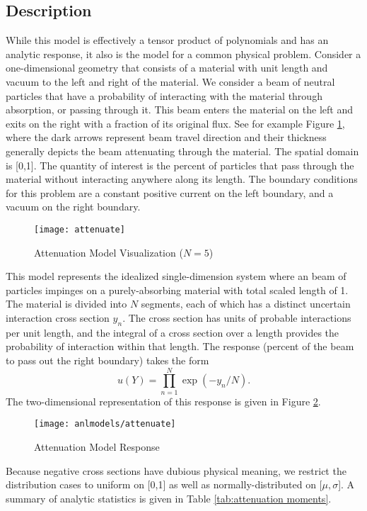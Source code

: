 \subsection{Description}\label{mod:attenuation}
While this model is effectively a tensor product of polynomials and has an analytic response, 
it also is the model for a common physical problem.
Consider a one-dimensional geometry that consists of a material with unit length and vacuum to the left and
right of the material.  We consider a beam of neutral particles that have a probability of interacting
with the material through absorption, or passing through it.  This beam enters the material on the left
and exits on the right with a fraction of its original flux.  See for example Figure \ref{fig: atten}, where
the dark arrows represent beam travel direction and their thickness generally depicts the beam attenuating
through the material.  The spatial domain is [0,1].
The quantity of interest is the percent of particles that pass through the material without interacting
anywhere along its length.  The boundary conditions for this problem are a constant positive current on the 
left boundary, and a vacuum on the right boundary.
\begin{figure}[htb]
  \centering
  \texttt{[image: attenuate]}
  \caption{Attenuation Model Visualization ($N=5$)}
  \label{fig: atten}
\end{figure}

This model represents the idealized single-dimension system where an beam of particles impinges on a
purely-absorbing material with total scaled length of 1.
The material is divided into $N$ segments, each of which
has a distinct uncertain interaction cross section $y_n$.  The cross section has units of probable interactions
per unit length, and the integral of a cross section over a length provides the probability of interaction
within that length.  The response (percent of the beam to pass out the right boundary) takes the form
\begin{equation}
  u(Y) = \prod_{n=1}^N \exp(-y_n/N).
\end{equation}
The two-dimensional representation of this response is given in Figure \ref{fig: attenuation}.
\begin{figure}[htb]
  \centering
  \texttt{[image: anlmodels/attenuate]}
  \caption{Attenuation Model Response}
  \label{fig: attenuation}
\end{figure}
Because negative cross sections have dubious physical meaning, we restrict the distribution cases to uniform
on [0,1] as well as normally-distributed on [$\mu,\sigma$].  A summary of analytic statistics is given in
Table \ref{tab:attenuation moments}.


